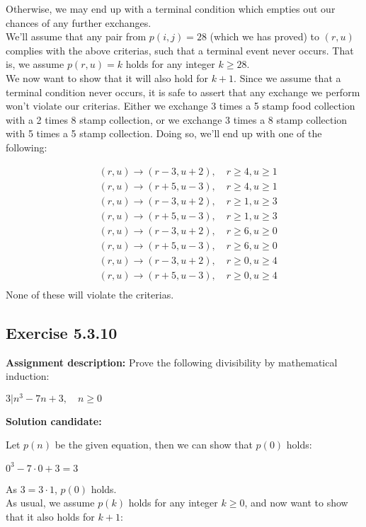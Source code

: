 \documentclass{report}
\newcommand{\cent}[1]{\begin{center}#1\end{center}}
\newcommand{\mAlign}[1]{\begin{align*}#1\end{align*}}
\newcommand{\assignmentDescription}{\textbf{Assignment description: }}
\newcommand{\solution}{\textbf{Solution candidate: }}
\newcommand{\QED}{\boxed{}}
\newcommand{\Exercise}[1]{\subsection{Exercise #1}}
\newcommand{\defaultEnumerateLabel}{\textbf{\alph*.}}
\begin{document}
\begin{enumerate}[label=\defaultEnumerateLabel]
 		Otherwise, we may end up with a terminal condition which empties out our chances of any further exchanges.\\
 		
 		We'll assume that any pair from $p(i,j) = 28$ (which we has proved) to $(r,u)$ complies with the above criterias, such that a terminal event never occurs. That is, we assume $p(r,u) = k$ holds for any integer $k \geq 28$. \\
 		
 		We now want to show that it will also hold for $k+1$. Since we assume that a terminal condition never occurs, it is safe to assert that any exchange we perform won't violate our criterias. Either we exchange 3 times a 5 stamp food collection with a 2 times 8 stamp collection, or we exchange 3 times a 8 stamp collection with 5 times a 5 stamp collection. Doing so, we'll end up with one of the following:
 		
 		\mAlign{
 			&(r,u) \to (r-3,u+2), \quad r \geq 4, u \geq 1 \\
 			&(r,u) \to (r+5,u-3), \quad r \geq 4, u \geq 1 \\
 			&(r,u) \to (r-3,u+2), \quad r \geq 1, u \geq 3 \\
 			&(r,u) \to (r+5,u-3), \quad r \geq 1, u \geq 3 \\
 			&(r,u) \to (r-3,u+2), \quad r \geq 6, u \geq 0 \\
 			&(r,u) \to (r+5,u-3), \quad r \geq 6, u \geq 0 \\
 			&(r,u) \to (r-3,u+2), \quad r \geq 0, u \geq 4 \\
 			&(r,u) \to (r+5,u-3), \quad r \geq 0, u \geq 4 \\
 		}
 		None of these will violate the criterias.\\
 		\QED
 	\end{enumerate}
 	
 	\Exercise{5.3.10}
 	
 	\assignmentDescription
 	Prove the following divisibility by mathematical induction:
 	
 	\cent{$3 | n^3-7n + 3, \quad n \geq 0$}
 	
 	\solution
 	
 	Let $p(n)$ be the given equation, then we can show that $p(0)$ holds:
 	
 	\cent{$0^3-7 \cdot 0 +3 = 3$}
 	
 	As $3 = 3 \cdot 1$, $p(0)$ holds.\\
 	
 	As usual, we assume $p(k)$ holds for any integer $k \geq 0$, and now want to show that it also holds for $k+1$:
 	
\end{document}

